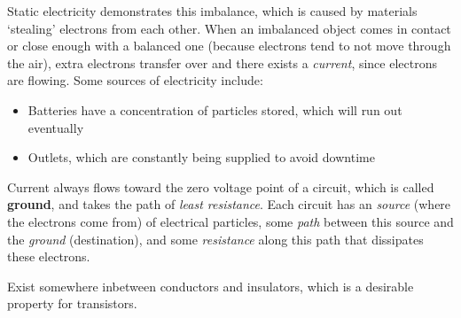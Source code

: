 Static electricity demonstrates this imbalance, which is caused by materials `stealing' electrons from each other. When an imbalanced object comes in contact or close enough with a balanced one (because electrons tend to not move through the air), extra electrons transfer over and there exists a \textit{current}, since electrons are flowing. Some sources of electricity include:
\begin{itemize}
\item Batteries have a concentration of particles stored, which will run out eventually
\item Outlets, which are constantly being supplied to avoid downtime
\end{itemize}

Current always flows toward the zero voltage point of a circuit, which is called \textbf{ground}, and takes the path of \textit{least resistance}. Each circuit has an \textit{source} (where the electrons come from) of electrical particles, some \textit{path} between this source and the \textit{ground} (destination), and some \textit{resistance} along this path that dissipates these electrons.

\begin{definition}[Semiconductor]
Exist somewhere inbetween conductors and insulators, which is a desirable property for transistors.
\end{definition}
